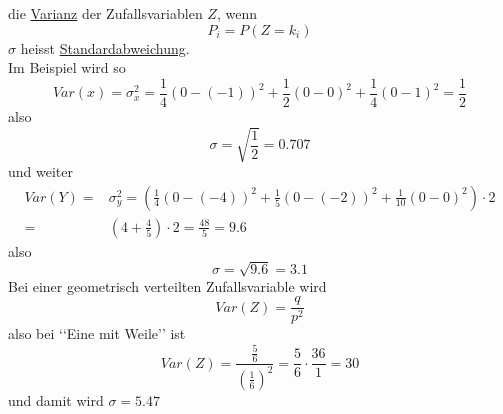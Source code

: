 \documentclass{report}
\begin{document}
die \underline{Varianz} der Zufallsvariablen $Z$, wenn
\begin{equation}
P_i = P(Z=k_i)
\end{equation}
$\sigma$ heisst \underline{Standardabweichung}.\\
Im Beispiel wird so
\begin{equation}
Var(x) = \sigma_x^2 = \frac{1}{4}(0-(-1))^2 + \frac{1}{2}(0-0)^2 + \frac{1}{4}(0-1)^2 = \frac{1}{2}
\end{equation}
also
\begin{equation}
\sigma = \sqrt{\frac{1}{2}} = 0.707
\end{equation}
und weiter
\begin{align*}
Var(Y) = & \sigma^2_y = \left(\frac{1}{4}(0-(-4))^2 + \frac{1}{5}(0-(-2))^2 + \frac{1}{10}(0-0)^2\right) \cdot 2\\
= & \left(4 + \frac{4}{5}\right) \cdot 2 = \frac{48}{5} = 9.6
\end{align*}
also
\begin{equation}
\sigma = \sqrt{9.6} = 3.1
\end{equation}
Bei einer geometrisch verteilten Zufallsvariable wird
\begin{equation}
Var(Z) = \frac{q}{p^2}
\end{equation}
also bei \lq\lq{}Eine mit Weile\rq\rq{} ist
\begin{equation}
Var(Z) = \frac{\frac{5}{6}}{\left(\frac{1}{6}\right)^2} = \frac{5}{6} \cdot \frac{36}{1} = 30
\end{equation}
und damit wird $\sigma = 5.47$
\end{document}
